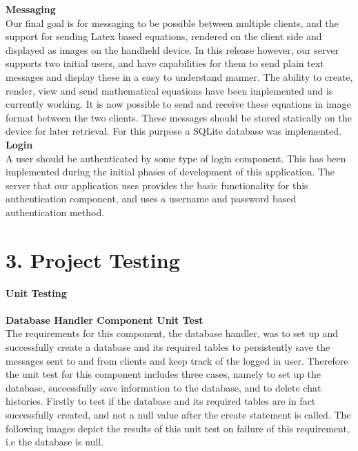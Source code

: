 \documentclass[29pt,a4paper]{moderncv}
\begin{document}
		
		\noindent\textbf{Messaging}
		\\Our final goal is for messaging to be possible between multiple clients, and the support for sending Latex based equations, rendered on the client side and displayed as images on the handheld device. In this release however, our server supports two initial users, and have capabilities for them to send plain text messages and display these in a easy to understand manner.  
		\parindent 5mm The ability to create, render, view and send mathematical equations have been implemented and is currently working. It is now possible to send and receive these equations in image format between the two clients.
		These messages should be stored statically on the device for later retrieval.  For this purpose a SQLite database was implemented.\\
		
		\noindent\textbf{Login}
		\\A user should be authenticated by some type of login component.  This has been implemented during the initial phases of development of this application.  The server that our application uses provides the basic functionality for this authentication component, and uses a username and password based authentication method.
		
\newpage
	\section*{3. Project Testing}
	\noindent \textbf{Unit Testing}\\
	\vspace{4mm}
	\\\textbf{Database Handler Component Unit Test}\\
	The requirements for this component, the database handler, was to set up and successfully create a database and its required tables to persistently save the messages sent to and from clients and keep track of the logged in user. Therefore the unit test for this component includes three cases, namely to set up the database, successfully save information to the database, and to delete chat histories.
	\parindent 5mm Firstly to test if the database and its required tables are in fact successfully created, and not a null value after the create statement is called. The following images depict the results of this unit test on failure of this requirement, i.e the database is null. \\
	
\end{document}
